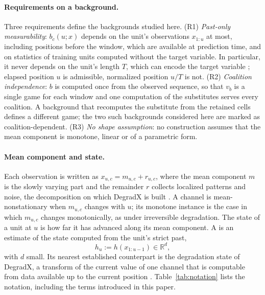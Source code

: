 \documentclass{article}
\begin{document}
\paragraph{Requirements on a background.} Three requirements define the backgrounds studied here. (R1) \emph{Past-only measurability}: $b_c(u;x)$ depends on the unit's observations $x_{1:u}$ at most, including positions before the window, which are available at prediction time, and on statistics of training units computed without the target variable. In particular, it never depends on the unit's length $T$, which can encode the target variable \citep{degradx2026}; elapsed position $u$ is admissible, normalized position $u/T$ is not. (R2) \emph{Coalition independence}: $b$ is computed once from the observed sequence, so that $v_b$ is a single game for each window and one computation of the substitutes serves every coalition. A background that recomputes the substitute from the retained cells defines a different game; the two such backgrounds considered here are marked as coalition-dependent. (R3) \emph{No shape assumption}: no construction assumes that the mean component is monotone, linear or of a parametric form.

\paragraph{Mean component and state.} Each observation is written as $x_{u,c} = m_{u,c} + r_{u,c}$, where the mean component $m$ is the slowly varying part and the remainder $r$ collects localized patterns and noise, the decomposition on which DegradX is built \citep{degradx2026}. A channel is mean-nonstationary when $m_{u,c}$ changes with $u$; its monotone instance is the case in which $m_{u,c}$ changes monotonically, as under irreversible degradation. The state of a unit at $u$ is how far it has advanced along its mean component. A  is an estimate of the state computed from the unit's strict past,
\begin{equation}\label{eq:stateindex}
h_u := h(x_{1:u-1}) \in \mathbb{R}^{d},
\end{equation}
with $d$ small. Its nearest established counterpart is the degradation state of DegradX, a transform of the current value of one channel that is computable from data available up to the current position \citep{degradx2026}. Table~\ref{tab:notation} lists the notation, including the terms introduced in this paper.
\end{document}
